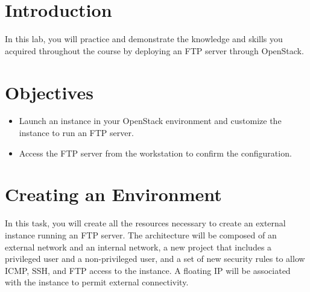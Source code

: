 \documentclass[letterpaper, 12pt]{article}
\begin{document}

\section*{Introduction}\label{sec:introduction}
In this lab, you will practice and demonstrate the knowledge and skills you acquired throughout the course by deploying an FTP server through OpenStack.

\section*{Objectives}\label{sec:objectives}
\begin{itemize}[itemsep=0pt]
    \item Launch an instance in your OpenStack environment and customize the instance to run an FTP server.
    \item Access the FTP server from the workstation to confirm the configuration.
\end{itemize}
\clearpage

\labsettings

\section{Creating an Environment}\label{sec:creating-an-environment}
In this task, you will create all the resources necessary to create an external instance running an FTP server.
The architecture will be composed of an external network and an internal network, a new project that includes a privileged user and a non-privileged user, and a set of new security rules to allow ICMP, SSH, and FTP access to the instance.
A floating IP will be associated with the instance to permit external connectivity.
\end{document}
